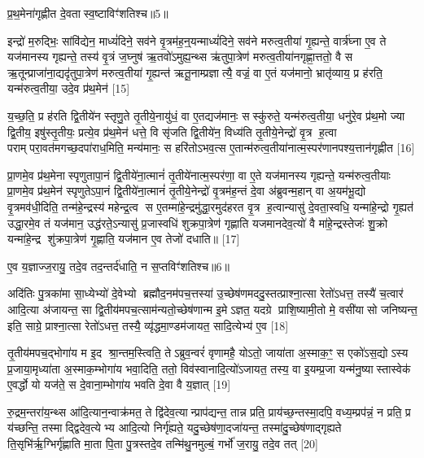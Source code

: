 {\scriptsize {प्र॒थ॒मेना॑गृह्णीत दे॒वतास्व॒ष्टाविꣳ॑शतिश्च॥5॥}}

इन्द्रो॑ म॒रुद्भिः॒ सांवि॑द्येन॒ माध्यं॑दिने॒ सव॑ने वृ॒त्रम॑ह॒न्॒यन्माध्यं॑दिने॒ सव॑ने मरुत्व॒तीया॑ गृ॒ह्यन्ते॒ वार्त्र॑घ्ना ए॒व ते यज॑मानस्य गृह्यन्ते॒ तस्य॑ वृ॒त्रं ज॒घ्नुष॑ ऋ॒तवो॑ऽमुह्य॒न्थ्स ऋ॑तुपा॒त्रेण॑ मरुत्व॒तीया॑नगृह्णा॒त्ततो॒ वै स ऋ॒तून्प्राजा॑ना॒द्यदृ॑तुपा॒त्रेण॑ मरुत्व॒तीया॑ गृ॒ह्यन्त॑ ऋतू॒नाम्प्रज्ञात्यै॒ वज्रं॒ वा ए॒तं यज॑मानो॒ भ्रातृ॑व्याय॒ प्र ह॑रति॒ यन्म॑रुत्व॒तीया॒ उदे॒व प्र॑थ॒मेन॑ [15]

य॒च्छ॒ति॒ प्र ह॑रति द्वि॒तीये॑न स्तृणु॒ते तृ॒तीये॒नायु॑धं॒ वा ए॒तद्यज॑मानः॒ सस्कु॑रुते॒ यन्म॑रुत्व॒तीया॒ धनु॑रे॒व प्र॑थ॒मो ज्या द्वि॒तीय॒ इषु॑स्तृ॒तीयः॒ प्रत्ये॒व प्र॑थ॒मेन॑ धत्ते॒ वि सृ॑जति द्वि॒तीये॑न॒ विध्य॑ति तृ॒तीये॒नेन्द्रो॑ वृ॒त्र ह॒त्वा पराम्परा॒वत॑मगच्छ॒दपा॑राध॒मिति॒ मन्य॑मानः॒ स हरि॑तोऽभव॒त्स ए॒तान्म॑रुत्व॒तीया॑नात्म॒स्पर॑णानपश्य॒त्तान॑गृह्णीत [16]

प्रा॒णमे॒व प्र॑थ॒मेनास्पृणुतापा॒नं द्वि॒तीये॑ना॒त्मानं॑ तृ॒तीये॑नात्म॒स्पर॑णा॒ वा ए॒ते यज॑मानस्य गृह्यन्ते॒ यन्म॑रुत्व॒तीयाः प्रा॒णमे॒व प्र॑थ॒मेन॑ स्पृणुतेऽपा॒नं द्वि॒तीये॑ना॒त्मानं॑ तृ॒तीये॒नेन्द्रो॑ वृ॒त्रम॑ह॒न्तं दे॒वा अ॑ब्रुवन्म॒हान् वा अ॒यम॑भू॒द्यो वृ॒त्रमव॑धी॒दिति॒ तन्म॑हे॒न्द्रस्य॑ महेन्द्र॒त्व स ए॒तम्मा॑हे॒न्द्रमु॑द्धा॒रमुद॑हरत वृ॒त्र ह॒त्वान्यासु॑ दे॒वता॒स्वधि॒ यन्मा॑हे॒न्द्रो गृ॒ह्यत॑ उद्धा॒रमे॒व तं यज॑मान॒ उद्ध॑रते॒ऽन्यासु॑ प्र॒जास्वधि॑ शुक्रपा॒त्रेण॑ गृह्णाति यजमानदेव॒त्यो॑ वै मा॑हे॒न्द्रस्तेजः॑ शु॒क्रो यन्मा॑हे॒न्द्र शु॑क्रपा॒त्रेण॑ गृ॒ह्णाति॒ यज॑मान ए॒व तेजो॑ दधाति॥ [17]

{\scriptsize {ए॒व य॒ज्ञाज्ज॒रायु॒ तदे॒व तद॒न्तर्द॑धाति॒ न स॒प्तविꣳ॑शतिश्च॥6॥}}

अदि॑तिः पु॒त्रका॑मा सा॒ध्येभ्यो॑ दे॒वेभ्यो ब्रह्मौद॒नम॑पच॒त्तस्या॑ उ॒च्छेष॑णमददु॒स्तत्प्राश्ना॒त्सा रेतो॑ऽधत्त॒ तस्यै॑ च॒त्वार॑ आदि॒त्या अ॑जायन्त॒ सा द्वि॒तीय॑मपच॒त्साम॑न्यतो॒च्छेष॑णान्म इ॒मेऽज्ञत॒ यदग्रे प्राशि॒ष्यामी॒तो मे॒ वसी॑यासो जनिष्यन्त॒ इति॒ साग्रे॒ प्राश्ना॒त्सा रेतो॑ऽधत्त॒ तस्यै॒ व्यृ॑द्धमा॒ण्डम॑जायत॒ सादि॒त्येभ्य॑ ए॒व [18]

तृ॒तीय॑मपच॒द्भोगा॑य म इ॒द श्रा॒न्तम॒स्त्विति॒ तेऽब्रुव॒न्वरं॑ वृणामहै॒ योऽतो॒ जाया॑ता अ॒स्माक॒ꣳ॒ स एको॑ऽस॒द्योऽस्य प्र॒जाया॒मृध्या॑ता अ॒स्माक॒म्भोगा॑य भवा॒दिति॒ ततो॒ विव॑स्वानादि॒त्यो॑ऽजायत॒ तस्य॒ वा इ॒यम्प्र॒जा यन्म॑नु॒ष्यास्तास्वेक॑ ए॒वर्द्धो यो यज॑ते॒ स दे॒वाना॒म्भोगा॑य भवति दे॒वा वै य॒ज्ञात् [19]

रु॒द्रम॒न्तरा॑य॒न्थ्स आ॑दि॒त्यान॒न्वाक्र॑मत॒ ते द्वि॑देव॒त्यान्प्राप॑द्यन्त॒ तान्न प्रति॒ प्राय॑च्छ॒न्तस्मा॒दपि॒ वध्य॒म्प्रप॑न्नं॒ न प्रति॒ प्र य॑च्छन्ति॒ तस्माद्द्विदेव॒त्येभ्य आदि॒त्यो निर्गृ॑ह्यते॒ यदु॒च्छेष॑णा॒दजा॑यन्त॒ तस्मा॑दु॒च्छेष॑णाद्गृह्यते ति॒सृभि॑र्\mbox{}ऋ॒ग्भिर्गृ॑ह्णाति मा॒ता पि॒ता पु॒त्रस्तदे॒व तन्मि॑थु॒नमुल्बं॒ गर्भो॑ ज॒रायु॒ तदे॒व तत् [20]

